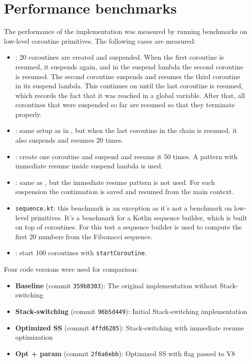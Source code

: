 \section{Performance benchmarks}
\label{sec:performance-bench}

The performance of the implementation was measured by running benchmarks on low-level coroutine primitives.
The following cases are measured:

\begin{itemize}
    \item {}: 20 coroutines are created and suspended. When the first coroutine is resumed, it
    suspends again, and in the suspend lambda the second coroutine is resumed. The second coroutine suspends and
    resumes the third coroutine in its suspend lambda. This continues on until the last coroutine is resumed, which
    records the fact that it was reached in a global variable. After that, all coroutines that were suspended so far
    are resumed so that they terminate properly.
    \item {}: same setup as in , but when the last coroutine
    in the chain is resumed, it also suspends and resumes 20 times.
    \item {}: create one coroutine and suspend and resume it 50 times. A pattern
    with immediate resume inside suspend lambda is used.
    \item {}: same as , but the immediate resume pattern
    is not used. For each suspension the continuation is saved and resumed from the main context.
    \item \texttt{sequence.kt}: this benchmark is an exception as it's not a benchmark on low-level primitives. It's a
    benchmark for a Kotlin sequence builder, which is built on top of coroutines. For this test a sequence builder
    is used to compute the first 20 numbers from the Fibonacci sequence.
    \item {}: start 100 coroutines with \texttt{startCoroutine}.
\end{itemize}

Four code versions were used for comparison:

\begin{itemize}
    \item \textbf{Baseline} (commit \texttt{359b8303}): The original implementation without Stack-switching
    \item \textbf{Stack-switching} (commit \texttt{96b5d449}): Initial Stack-switching implementation
    \item \textbf{Optimized SS} (commit \texttt{4ffd6205}): Stack-switching with immediate resume optimization
    \item \textbf{Opt + param} (commit \texttt{2f6a6ebb}): Optimized SS with  flag passed to V8
\end{itemize}

